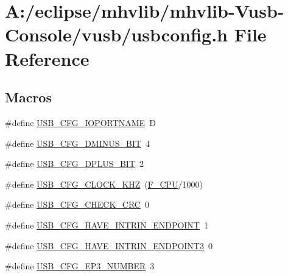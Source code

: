 \hypertarget{mhvlib-_vusb-_console_2vusb_2usbconfig_8h}{\section{A\-:/eclipse/mhvlib/mhvlib-\/\-Vusb-\/\-Console/vusb/usbconfig.h File Reference}
\label{mhvlib-_vusb-_console_2vusb_2usbconfig_8h}
}
\subsection*{Macros}
\begin{DoxyCompactItemize}
\item 
\#define \hyperlink{mhvlib-_vusb-_console_2vusb_2usbconfig_8h_a98ed17962b55543b35e10ae1f8ebe09b}{U\-S\-B\-\_\-\-C\-F\-G\-\_\-\-I\-O\-P\-O\-R\-T\-N\-A\-M\-E}~D
\item 
\#define \hyperlink{mhvlib-_vusb-_console_2vusb_2usbconfig_8h_a3a8bf6679cd70d1ddcc05024ffef9922}{U\-S\-B\-\_\-\-C\-F\-G\-\_\-\-D\-M\-I\-N\-U\-S\-\_\-\-B\-I\-T}~4
\item 
\#define \hyperlink{mhvlib-_vusb-_console_2vusb_2usbconfig_8h_a3005cdbb03c707af8007363632d7d02d}{U\-S\-B\-\_\-\-C\-F\-G\-\_\-\-D\-P\-L\-U\-S\-\_\-\-B\-I\-T}~2
\item 
\#define \hyperlink{mhvlib-_vusb-_console_2vusb_2usbconfig_8h_a9bf12dabd0e5186299ed0f13cd00dfeb}{U\-S\-B\-\_\-\-C\-F\-G\-\_\-\-C\-L\-O\-C\-K\-\_\-\-K\-H\-Z}~(\hyperlink{mhvlib-_vusb-_console_2vusb_2oddebug_8h_a43bafb28b29491ec7f871319b5a3b2f8}{F\-\_\-\-C\-P\-U}/1000)
\item 
\#define \hyperlink{mhvlib-_vusb-_console_2vusb_2usbconfig_8h_a57122aa75d9b598adcd238aee5f2b4b7}{U\-S\-B\-\_\-\-C\-F\-G\-\_\-\-C\-H\-E\-C\-K\-\_\-\-C\-R\-C}~0
\item 
\#define \hyperlink{mhvlib-_vusb-_console_2vusb_2usbconfig_8h_afe176bba6f05a034a5eec11f7ed6302b}{U\-S\-B\-\_\-\-C\-F\-G\-\_\-\-H\-A\-V\-E\-\_\-\-I\-N\-T\-R\-I\-N\-\_\-\-E\-N\-D\-P\-O\-I\-N\-T}~1
\item 
\#define \hyperlink{mhvlib-_vusb-_console_2vusb_2usbconfig_8h_a973c0b60531876ba52c4447e0fd0a150}{U\-S\-B\-\_\-\-C\-F\-G\-\_\-\-H\-A\-V\-E\-\_\-\-I\-N\-T\-R\-I\-N\-\_\-\-E\-N\-D\-P\-O\-I\-N\-T3}~0
\item 
\#define \hyperlink{mhvlib-_vusb-_console_2vusb_2usbconfig_8h_a6ba1def233ee0e102febe80e53af53a7}{U\-S\-B\-\_\-\-C\-F\-G\-\_\-\-E\-P3\-\_\-\-N\-U\-M\-B\-E\-R}~3
\item 

\end{DoxyCompactItemize}

